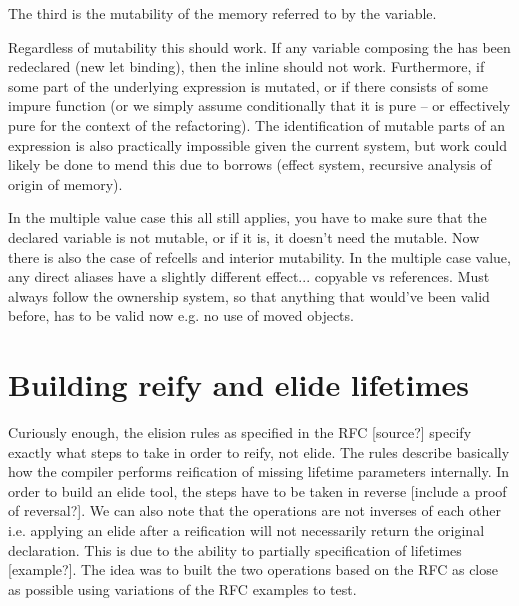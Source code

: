 The third is the mutability of the memory referred to by the variable.


Regardless of mutability this should work. If any variable composing the has been redeclared (new let binding), then the inline should not work. Furthermore, if some part of the underlying expression is mutated, or if there consists of some impure function (or we simply assume conditionally that it is pure -- or effectively pure for the context of the refactoring).  The identification of mutable parts of an expression is also practically impossible given the current system, but work could likely be done to mend this due to borrows (effect system, recursive analysis of origin of memory). 






In the multiple value case this all still applies, you have to make sure that the declared variable is not mutable, or if it is, it doesn't need the mutable. Now there is also the case of refcells and interior mutability. In the multiple case value, any direct aliases have a slightly different effect... copyable vs references. Must always follow the ownership system, so that anything that would've been valid before, has to be valid now e.g. no use of moved objects. 


\section{Building reify and elide lifetimes}\label{S:buildreielide}
Curiously enough, the elision rules as specified in the RFC [source?] specify exactly what steps to take in order to reify, not elide. The rules describe basically how the compiler performs reification of missing lifetime parameters internally. In order to build an elide tool, the steps have to be taken in reverse [include a proof of reversal?]. We can also note that the operations are not inverses of each other i.e. applying an elide after a reification will not necessarily return the original declaration. This is due to the ability to partially specification of lifetimes [example?]. The idea was to built the two operations based on the RFC as close as possible using variations of the RFC examples to test.


